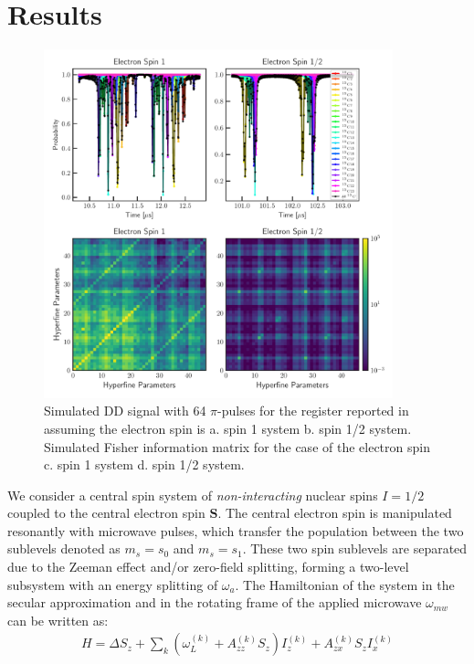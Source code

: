 \documentclass[%
 reprint,
superscriptaddress,
 amsmath,amssymb,
 aps,
]{revtex4-2}
\begin{document}
\section{Results}
\label{sec:theory}
\begin{figure}%
	\begin{center}
		\includegraphics[width=0.9\textwidth]{pict/dd_compare2.pdf}
		\caption{Simulated DD signal with 64 $\pi$-pulses for the register reported in  \cite{abobeih2019atomic} assuming the electron spin is a. spin 1 system b. spin 1/2 system. Simulated Fisher information matrix for the case of the electron spin c. spin 1 system d. spin 1/2 system.}
		\label{fig:3}
	\end{center}
\end{figure}
We consider a central spin system of \textit{non-interacting} nuclear spins $I=1/2$ coupled to the central electron spin $\boldsymbol{S}$.
The central electron spin is manipulated resonantly with microwave pulses, which transfer the population between the two sublevels denoted as $m_s=s_0$ and $m_s = s_1$.
These two spin sublevels are separated due to the Zeeman effect and/or zero-field splitting, forming a two-level subsystem with an energy splitting of $\omega_a$.
The Hamiltonian of the system in the secular approximation and in the rotating frame of the applied microwave $\omega_{mw}$ can be written as:
\begin{align}
	H = \Delta S_z + \sum_k (\omega_L^{(k)}  + A_{zz}^{(k)} S_z) I_z^{(k)} + A_{zx}^{(k)} S_z I_x^{(k)}
	\label{eq:H}
\end{align}
\end{document}
